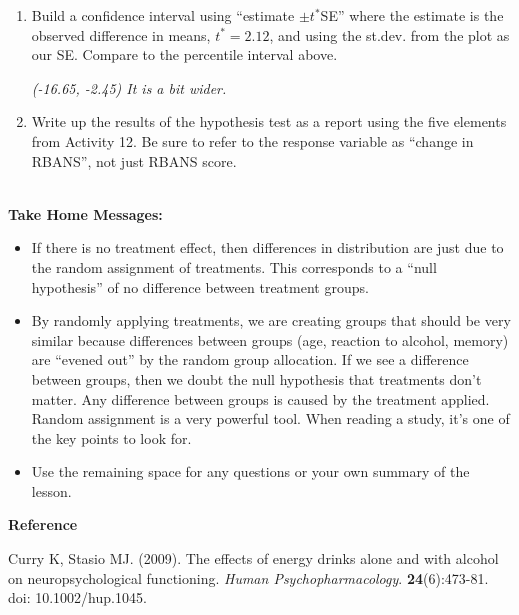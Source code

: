 \begin{enumerate}
\begin{key}
  {\it  We are 95\% confident that the true mean ``change in RBANS score''
  is  2.7 to 15.99 points lower when people drink REDA than when they
   drink the control beverage. Be sure to indicate which one is higher
 (or lower). } 
\end{key}
\item Build a confidence interval using ``estimate $\pm t^*$SE'' where the
  estimate is the observed difference in means, $t^* = 2.12$, and
  using the st.dev. from the plot as our SE.  Compare to the
  percentile interval above.
 \begin{students}
    \vspace{2cm}    
\end{students}

\begin{key}
  {\it (-16.65, -2.45)  It is a bit wider.}
\end{key}


\item Write up the results of the hypothesis test as a report using
  the five elements from Activity 12.  Be sure to refer to the response
  variable as ``change in RBANS'', not just RBANS score. \\ \ \\

\begin{students}
 \newpage 
\end{students}
 \end{enumerate}


{\sf\bf Take Home Messages:}
\begin{itemize}
  \item 
  If there is no treatment effect, then differences in distribution
  are just due to the random assignment of treatments.  This
  corresponds to a ``null hypothesis'' of no difference between
  treatment groups.
\item  By randomly applying treatments, we are creating groups that
  should be very similar because differences between groups (age,
  reaction to alcohol, memory) are “evened out” by the random group
  allocation. If we see a difference between groups, then we doubt the
  null hypothesis that treatments don't matter.  Any difference
  between groups is caused by the treatment applied.  Random
  assignment is a very powerful tool.  When reading a study, it's one
  of the key points to look for. 
 \item 
  Use the remaining space for any questions or your own summary of the
  lesson. \vfill

\end{itemize}
{\sf\bf Reference}

 Curry K, Stasio MJ.  (2009). The effects of energy drinks alone and with
 alcohol on neuropsychological functioning. {\it Human  Psychopharmacology}.
{\bf 24}(6):473-81. doi: 10.1002/hup.1045. 


